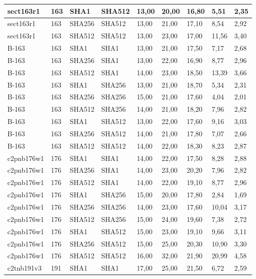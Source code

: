 \begin{longtable}{| l | l | l | l | l |l |l |l |l |}
sect163r1 & 163 & SHA1 & SHA512 & 13,00 & 20,00 & 16,80 & 5,51 & 2,35 \\ \hline 
sect163r1 & 163 & SHA256 & SHA512 & 13,00 & 21,00 & 17,10 & 8,54 & 2,92 \\ \hline 
sect163r1 & 163 & SHA512 & SHA512 & 13,00 & 23,00 & 17,00 & 11,56 & 3,40 \\ \hline 
B-163 & 163 & SHA1 & SHA1 & 13,00 & 21,00 & 17,50 & 7,17 & 2,68 \\ \hline 
B-163 & 163 & SHA256 & SHA1 & 13,00 & 22,00 & 16,90 & 8,77 & 2,96 \\ \hline 
B-163 & 163 & SHA512 & SHA1 & 14,00 & 23,00 & 18,50 & 13,39 & 3,66 \\ \hline 
B-163 & 163 & SHA1 & SHA256 & 13,00 & 21,00 & 18,70 & 5,34 & 2,31 \\ \hline 
B-163 & 163 & SHA256 & SHA256 & 15,00 & 21,00 & 17,60 & 4,04 & 2,01 \\ \hline 
B-163 & 163 & SHA512 & SHA256 & 14,00 & 21,00 & 18,20 & 7,96 & 2,82 \\ \hline 
B-163 & 163 & SHA1 & SHA512 & 13,00 & 22,00 & 17,60 & 9,16 & 3,03 \\ \hline 
B-163 & 163 & SHA256 & SHA512 & 14,00 & 21,00 & 17,80 & 7,07 & 2,66 \\ \hline 
B-163 & 163 & SHA512 & SHA512 & 14,00 & 22,00 & 18,30 & 8,23 & 2,87 \\ \hline 
c2pnb176w1 & 176 & SHA1 & SHA1 & 14,00 & 22,00 & 17,50 & 8,28 & 2,88 \\ \hline 
c2pnb176w1 & 176 & SHA256 & SHA1 & 14,00 & 23,00 & 20,20 & 7,96 & 2,82 \\ \hline 
c2pnb176w1 & 176 & SHA512 & SHA1 & 14,00 & 22,00 & 19,10 & 8,77 & 2,96 \\ \hline 
c2pnb176w1 & 176 & SHA1 & SHA256 & 15,00 & 20,00 & 17,80 & 2,84 & 1,69 \\ \hline 
c2pnb176w1 & 176 & SHA256 & SHA256 & 14,00 & 23,00 & 17,60 & 10,04 & 3,17 \\ \hline 
c2pnb176w1 & 176 & SHA512 & SHA256 & 15,00 & 24,00 & 19,60 & 7,38 & 2,72 \\ \hline 
c2pnb176w1 & 176 & SHA1 & SHA512 & 15,00 & 23,00 & 19,10 & 9,66 & 3,11 \\ \hline 
c2pnb176w1 & 176 & SHA256 & SHA512 & 15,00 & 25,00 & 20,30 & 10,90 & 3,30 \\ \hline 
c2pnb176w1 & 176 & SHA512 & SHA512 & 16,00 & 32,00 & 21,90 & 20,99 & 4,58 \\ \hline 
c2tnb191v3 & 191 & SHA1 & SHA1 & 17,00 & 25,00 & 21,50 & 6,72 & 2,59 \\ \hline 

\end{longtable}
